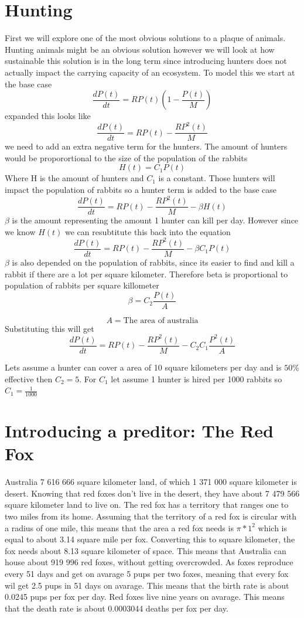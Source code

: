 \documentclass{article}
\begin{document}
\section{Hunting}
First we will explore one of the most obvious solutions to a plaque of animals. Hunting animals might be an obvious solution however we will look at how sustainable this solution is in the long term since introducing hunters does not actually impact the carrying capacity of an ecosystem. To model this we start at the base case 
$$
\frac{dP(t)}{dt} = RP(t)(1-\frac{P(t)}{M})
$$
expanded this looks like 
$$
\frac{dP(t)}{dt} = RP(t)-\frac{RP^2(t)}{M}
$$
we need to add an extra negative term for the hunters. The amount of hunters would be proporortional to the size of the population of the rabbits
$$
H(t) = C_1 P(t)
$$
Where H is the amount of hunters and $C_1$ is a constant. Those hunters will impact the population of rabbits so a hunter term is added to the base case
$$
\frac{dP(t)}{dt} = RP(t)-\frac{RP^2(t)}{M} - \beta H(t)
$$
$\beta$ is the amount representing the amount 1 hunter can kill per day. However since we know $H(t)$ we can resubtitute this back into the equation
$$
\frac{dP(t)}{dt} = RP(t)-\frac{RP^2(t)}{M} - \beta C_1 P(t)
$$
$\beta $ is also depended on the population of rabbits, since its easier to find and kill a rabbit if there are a lot per square kilometer. Therefore beta is proportional to population of rabbits per square killometer
$$
\beta = C_2 \frac{P(t)}{A}
$$

$$A = \text{The area of australia}$$
Substituting this will get 
$$
\frac{dP(t)}{dt} = RP(t)-\frac{RP^2(t)}{M} - C_2 C_1 \frac{P^2(t)}{A}
$$

Lets assume a hunter can cover a area of 10 square kilometers per day and is $50\%$ effective then $C_2 = 5$. For  $C_1$ let assume 1 hunter is hired per 1000 rabbits so $C_1 = \frac{1}{1000}$
\section{Introducing a preditor: The Red Fox}
Australia 7 616 666 square kilometer land, of which 1 371 000 square kilometer is desert. Knowing that red foxes don't live in the desert, they have about 7 479 566 square kilometer land to live on. The red fox has a territory that ranges one to two miles from its home. Assuming that the territory of a red fox is circular with a radius of one mile, this means that the area a red fox needs is $\pi*1^2$ which is equal to about 3.14 square mile per fox. Converting this to square kilometer, the fox needs about 8.13 square kilometer of space. This means that Australia can house about 919 996 red foxes, without getting overcrowded. As foxes reproduce every 51 days and get on avarage 5 pups per two foxes, meaning that every fox wil get 2.5 pups in 51 days on avarage. This means that the birth rate is about 0.0245 pups per fox per day. Red foxes live nine years on avarage. This means that the death rate is about 0.0003044 deaths per fox per day.
\end{document}

